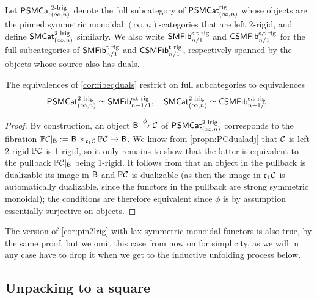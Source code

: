 \documentclass[a4paper,11pt]{article}
\begin{document}
\begin{notation}
  Let $\textup{\textsf{P}}^{}\textup{\textsf{SMCat}}_{(\infty,n)}^{2\text{\textup{-lrig}}}$ denote the full subcategory of
  $\textup{\textsf{P}}^{}\textup{\textsf{SMCat}}_{(\infty,n)}^{\text{\textup{rig}}}$ whose objects are the pinned symmetric
  monoidal $(\infty,n)$-categories that are left 2-rigid, and define
  $\textup{\textsf{SMCat}}_{(\infty,n)}^{2\text{\textup{-lrig}}}$ similarly. We also write
  $\textup{\textsf{SMFib}}^{\text{\textup{s,t-rig}}}_{n/1}$ and $\textup{\textsf{CSMFib}}^{\text{\textup{s,t-rig}}}_{n/1}$ for the full subcategories of
  $\textup{\textsf{SMFib}}^{\text{\textup{t-rig}}}_{n/1}$ and $\textup{\textsf{CSMFib}}^{\text{\textup{t-rig}}}_{n/1}$, respectively spanned by the
  objects whose source also has duals.
\end{notation}
\begin{cor}\label{cor:pin2lrig}
  The equivalences of \cref{cor:fibeqduals} restrict on full
  subcategories to equivalences
  \[ \textup{\textsf{P}}^{}\textup{\textsf{SMCat}}_{(\infty,n)}^{2\text{\textup{-lrig}}} \simeq \textup{\textsf{SMFib}}^{\text{\textup{s,t-rig}}}_{n-1/1}, \quad
    \textup{\textsf{SMCat}}_{(\infty,n)}^{2\text{\textup{-lrig}}} \simeq \textup{\textsf{CSMFib}}^{\text{\textup{s,t-rig}}}_{n-1/1}. \]
\end{cor}
\begin{proof}
  By construction, an object $\oB \xto{\phi} \nC$ of $\textup{\textsf{P}}^{}\textup{\textsf{SMCat}}_{(\infty,n)}^{2\text{\textup{-lrig}}}$
  corresponds to the fibration $\mP\nC|_{\oB} := \oB \times_{\core \nC} \mP\nC \to
  \oB$. We know from \cref{propn:PCdualadj} that $\mathcal{C}$ is left 2-rigid
  \IFF{} $\mathbb{P}\mathcal{C}$ is 1-rigid, so it only remains to show that the
  latter is equivalent to the pullback $\mathbb{P}\mathcal{C}|_{\textup{\textsf{B}}}$
  being 1-rigid. It follows from \cite[Proposition 4.6.1.11]{HA} that
  an object in the pullback is dualizable \IFF{} its image in $\textup{\textsf{B}}$
  and $\mathbb{P}\mathcal{C}$ is dualizable (as then the image in $\mathfrak{c}_{1} \mathcal{C}$ is
  automatically dualizable, since the functors in the pullback are
  strong symmetric monoidal); the conditions are therefore equivalent
  since $\phi$ is by assumption essentially surjective on objects.
\end{proof}

\begin{remark}
  The version of \cref{cor:pin2lrig} with lax symmetric monoidal
  functors is also true, by the same proof, but we omit this case from
  now on for simplicity, as we will in any case have to drop it when
  we get to the inductive unfolding process below.
\end{remark}

\subsection{Unpacking to a square}
\label{sec:unpack square}
\end{document}
